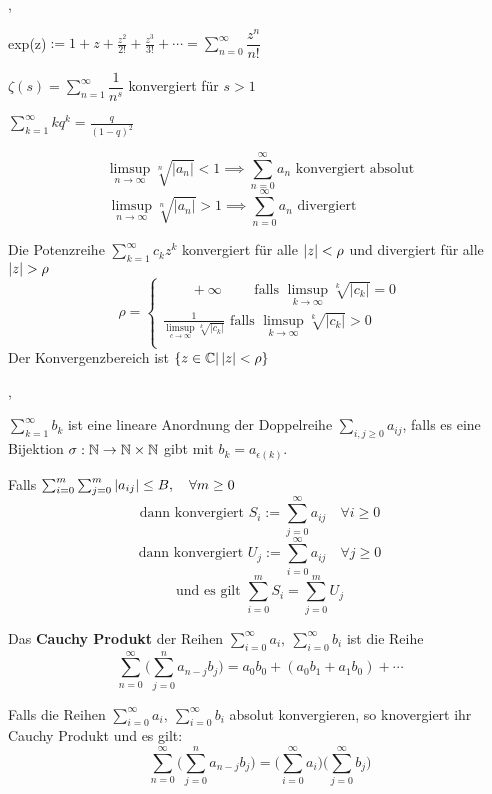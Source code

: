 \sep

\Bsp exp(z)$ := 1 + z + \frac{z^2}{2!} + \frac{z^3}{3!} + \cdots = \sum_{n=0}^{\infty} \dfrac{z^{n}}{n!}$

\Bsp $\zeta(s) =  \sum_{n=1}^{\infty} \dfrac{1}{n^s}$ konvergiert für $s > 1$

\Bsp $\sum_{k=1}^{\infty} k q^k = \frac{q}{(1- q)^2}$

\Satz[Wurzelkriterium] 
\[\limsup\limits_{n \rightarrow \infty} \sqrt[n]{\left|a_{n}\right|}<1 \implies \sum_{n=0}^{\infty} a_{n} \text{ konvergiert absolut} \]
\[\limsup\limits_{n \rightarrow \infty} \sqrt[n]{\left|a_{n}\right|}>1 \implies \sum_{n=0}^{\infty} a_{n} \text{ divergiert} \quad \quad \quad \quad \]

\Korollar[2.7.21] Die Potenzreihe $\sum_{k=1}^{\infty} c_{k} z^k$ konvergiert für alle $\left\lvert z \right\rvert < \rho$ und divergiert für alle $\left\lvert z \right\rvert > \rho$
\[\rho =\begin{cases}
\quad \quad + \infty \quad \quad \text{ falls } \limsup\limits_{k \rightarrow \infty} \sqrt[k]{\left|c_{k}\right|} = 0 \\
\frac{1}{\limsup\limits_{c \rightarrow \infty} \sqrt[k]{\left|c_{k}\right|}}  \text{ falls } \limsup\limits_{k \rightarrow \infty} \sqrt[k]{\left|c_{k}\right|} > 0 \\
\end{cases}\]
\Bem Der Konvergenzbereich ist $\{z \in  \mathbb{C} | \left\lvert z \right\rvert < \rho\}$

\sep

\Def[2.7.22] $\sum_{k=1}^{\infty} b_{k}$ ist eine lineare Anordnung der Doppelreihe $\sum_{i,j \geq 0} a_{ij}$, falls es eine Bijektion $\sigma : \mathbb{N} \rightarrow \mathbb{N} \times \mathbb{N}$ gibt mit $b_k = a_{\epsilon(k)}$.

\Satz[2.7.23] Falls $\sum_{i=0}^{m}\sum_{j=0}^{m}\left\lvert a_{ij} \right\rvert \leq B, \quad \forall m \geq 0$
\[ \text{dann konvergiert } S_{i} := \sum_{j=0}^{\infty} a_{ij} \quad \forall i \geq 0 \]
\[ \text{dann konvergiert } U_{j} := \sum_{i=0}^{\infty} a_{ij} \quad \forall j \geq 0 \]
\[ \text{und es gilt } \sum_{i=0}^{m} S_{i} = \sum_{j=0}^{m} U_{j} \]

\Satz[2.7.24] Das \textbf{Cauchy Produkt} der Reihen $\sum_{i=0}^{\infty} a_i, \ \sum_{i=0}^{\infty} b_i$ ist die Reihe
\[\sum_{n=0}^\infty \Bigg(\sum_{j=0}^{n} a_{n-j} b_{j} \Bigg) = a_0 b_0 + (a_0 b_1 + a_1 b_0) + \cdots  \]

\Satz[2.7.26] Falls die Reihen $\sum_{i=0}^{\infty} a_i, \ \sum_{i=0}^{\infty} b_i$ absolut konvergieren, so knovergiert ihr Cauchy Produkt und es gilt:
\[\sum_{n=0}^\infty \Bigg(\sum_{j=0}^{n} a_{n-j} b_{j} \Bigg) = \Bigg( \sum_{i=0}^\infty a_i \Bigg) \Bigg(\sum_{j=0}^\infty b_j \Bigg) \]

